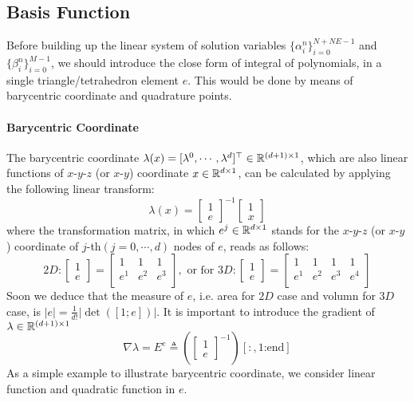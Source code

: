 \subsection{Basis Function}
Before building up the linear system of solution variables $\{\alpha_i^n\}_{i=0}^{N+NE-1}$ and $\{\beta_i^n\}_{i=0}^{M-1}$,
we should introduce the close form of integral of polynomials,
in a single triangle/tetrahedron element $e$. 
This would be done by means of barycentric coordinate and quadrature points.

\paragraph{Barycentric Coordinate}
The barycentric coordinate 
$\lambda(x)=[\lambda^0,\cdots,\lambda^d]^\top\in\mathbb{R}^{(d+1)\times1}$, 
which are also linear functions of $x$-$y$-$z$ (or $x$-$y$) coordinate 
$x\in\mathbb{R}^{d\times1}$, can be calculated by applying the following linear transform:
\[
  \lambda(x)=
  \left[\begin{array}{c}
    1 \\
    e
  \end{array}
  \right]^{-1}
  \left[\begin{array}{c}
    1 \\
    x
  \end{array}\right]
\]
where the transformation matrix, in which $e^j\in\mathbb{R}^{d\times1}$ stands for the 
$x$-$y$-$z$ (or $x$-$y$) coordinate of 
$j$-th$(j=0,\cdots,d)$ nodes of $e$, reads as follows:
\[
  2D:
  \left[\begin{array}{c}
    1 \\
    e
  \end{array}
  \right]=
\left[\begin{array}{ccc}
  1   & 1   & 1   \\
  e^1 & e^2 & e^3 \\
\end{array}
  \right]
  , \text{ or for }3D:
  \left[\begin{array}{c}
    1 \\
    e
  \end{array}
  \right]=
\left[\begin{array}{cccc}
  1   & 1   & 1   & 1   \\
  e^1 & e^2 & e^3 & e^4 \\
\end{array}
  \right]
\]
Soon we deduce that the measure of $e$, i.e. area for $2D$ case and volumn for $3D$ case, 
is $|e|=\frac{1}{d!}|\det([1;e])|$.
It is important to introduce the gradient of $\lambda\in\mathbb{R}^{(d+1)\times1}$
\[
  \nabla \lambda = E^e
  \triangleq\left(\left[\begin{array}{c} 1 \\ e \end{array}\right]^{-1}\right)[:,1\text{:end}]
    \]
  As a simple example to illustrate barycentric coordinate, 
we consider linear function and quadratic function in $e$.

